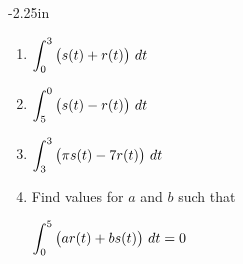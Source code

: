 \begin{adjustwidth*}{}{-2.25in}
\begin{multicols*}{2}

\begin{enumerate}[1),resume]
\item $\ds \int_0^3 \big(s(t) + r(t)\big)\ dt$
\item $\ds \int_5^0 \big(s(t) - r(t)\big)\ dt$
\item $\displaystyle \int_3^3 \big(\pi s(t) - 7r(t)\big)\ dt$
\item Find values for $a$ and $b$ such that 

$\ds \int_0^5 \big(ar(t)+bs(t)\big) \ dt=0$


\end{enumerate}
\end{multicols*}
\end{adjustwidth*}
